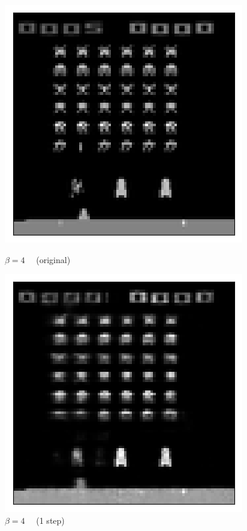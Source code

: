 \begin{figure}[h!]
\begin{multicols}{4}
    \includegraphics[scale=0.4]{figures/results/indiscriminate_decoupling/beta_4_posterior_sample_original.png}
    \caption{$\beta=4\quad$ (original)}
    \includegraphics[scale=0.4]{figures/results/indiscriminate_decoupling/beta_4_posterior_sample_0.png}
    \caption{$\beta=4\quad$ (1 step)}

\end{multicols}
\end{figure}
